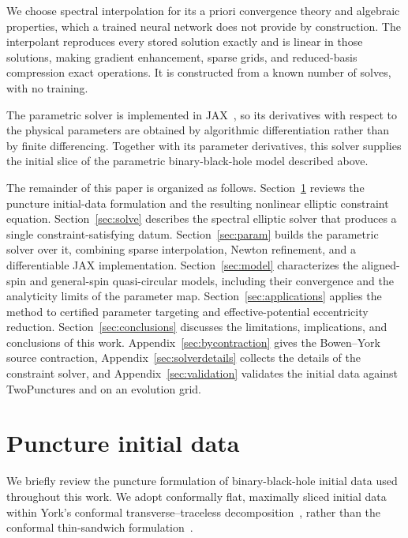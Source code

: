 \documentclass[
  aps,
  prd,
  twocolumn,
  10pt,
  amsmath,
  amssymb,
  nofootinbib,
  superscriptaddress,
  floatfix,
]{revtex4-2}
\newif\ifshowreferee \showrefereetrue
\newcommand{\refereetext}[1]{\ifshowreferee{\color{refereepurple}#1}\else#1\fi}
\begin{document}
\refereetext{We choose spectral interpolation for its a priori convergence theory and algebraic properties, which a trained neural network does not provide by construction.}
\refereetext{The interpolant reproduces every stored solution exactly and is linear in those solutions, making gradient enhancement, sparse grids, and reduced-basis compression exact operations.}
\refereetext{It is constructed from a known number of solves, with no training.}


The parametric solver is implemented in JAX~\cite{Jax2018}, so its derivatives with respect to the physical parameters are obtained by algorithmic differentiation rather than by finite differencing.
\refereetext{Together with its parameter derivatives, this solver supplies the initial slice of the parametric binary-black-hole model described above.}


The remainder of this paper is organized as follows.
Section~\ref{sec:problem} reviews the puncture initial-data formulation and the resulting nonlinear elliptic constraint equation.
Section~\ref{sec:solve} describes the spectral elliptic solver that produces a single constraint-satisfying datum.
Section~\ref{sec:param} builds the parametric solver over it, combining sparse interpolation, Newton refinement, and a differentiable JAX implementation.
Section~\ref{sec:model} characterizes the aligned-spin and general-spin quasi-circular models, including their convergence and the analyticity limits of the para\-meter map.
Section~\ref{sec:applications} applies the method to certified para\-meter targeting and effective-potential eccentricity reduction.
Section~\ref{sec:conclusions} discusses the limitations, implications, and conclusions of this work.
Appendix~\ref{sec:bycontraction} gives the Bowen--York source contraction, Appendix~\ref{sec:solverdetails} collects the details of the constraint solver, and Appendix~\ref{sec:validation} validates the initial data against TwoPunctures and on an evolution grid.


\section{Puncture initial data}
\label{sec:problem}
We briefly review the puncture formulation of binary-black-hole initial data used
throughout this work. We adopt conformally flat, maximally sliced initial data
within York's conformal transverse--traceless
de\-com\-position~\cite{York1979,Cook2000}, rather than the conformal thin-sandwich
formulation~\cite{York1999}.
\end{document}

